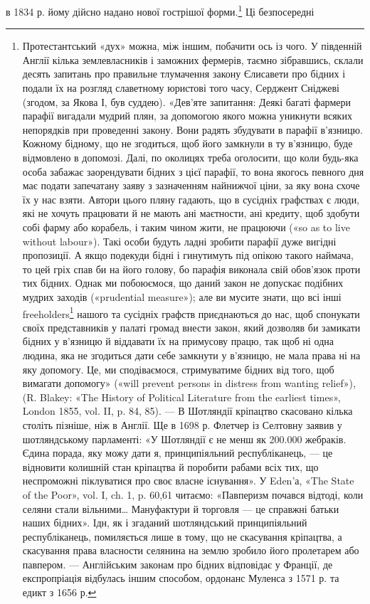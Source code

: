 \parcont{}  %
в 1834 р. йому дійсно надано нової гострішої форми.\footnote{
Протестантський «дух» можна, між іншим, побачити ось із чого.
У південній Англії кілька землевласників і заможних фермерів, таємно
зібравшись, склали десять запитань про правильне тлумачення закону
Єлисавети про бідних і подали їх на розгляд славетному юристові того
часу, Серджент Сніджеві (згодом, за Якова І, був суддею). «Дев’яте запитання:
Деякі багаті фармери парафії вигадали мудрий плян, за допомогою
якого можна уникнути всяких непорядків при проведенні закону.
Вони радять збудувати в парафії в’язницю. Кожному бідному, що не
згодиться, щоб його замкнули в ту в’язницю, буде відмовлено в допомозі.
Далі, по околицях треба оголосити, що коли будь-яка особа забажає
заорендувати бідних з цієї парафії, то вона якогось певного дня
має подати запечатану заяву з зазначенням найнижчої ціни, за яку вона
схоче їх у нас взяти. Автори цього пляну гадають, що в сусідніх графствах
є люди, які не хочуть працювати й не мають ані маєтности, ані
кредиту, щоб здобути собі фарму або корабель, і таким чином жити,
не працюючи («so as to live without labour»). Такі особи будуть ладні
зробити парафії дуже вигідні пропозиції. А якщо подекуди бідні і гинутимуть
під опікою такого наймача, то цей гріх спав би на його голову,
бо парафія виконала свій обов’язок проти тих бідних. Однак ми побоюємося,
що даний закон не допускає подібних мудрих заходів («prudential
measure»); але ви мусите знати, що всі інші freeholders\footnote*{
— вільні дрібні господарства. \emph{Ред.}
} нашого та
сусідніх графств приєднаються до нас, щоб спонукати своїх представників
у палаті громад внести закон, який дозволяв би замикати бідних у
в’язницю й віддавати їх на примусову працю, так щоб ні одна людина,
яка не згодиться дати себе замкнути у в’язницю, не мала права ні на яку
допомогу. Це, ми сподіваємося, стримуватиме бідних від того, щоб вимагати
допомогу» («will prevent persons in distress from wanting relief»),
(R. Blakey: «The History of Political Literature from the earliest times»,
London 1855, vol. II, p. 84, 85). — В Шотляндії кріпацтво скасовано
кілька століть пізніше, ніж в Англії. Ще в 1698 р. Флетчер із Селтовну
заявив у шотляндському парламенті: «У Шотляндії є не менш як 200.000
жебраків. Єдина порада, яку можу дати я, принципіяльний республіканець,
— це відновити колишній стан кріпацтва й поробити рабами всіх
тих, що неспроможні піклуватися про своє власне існування». У Eden’а,
«The State of the Poor», vol. I, ch. 1, p. 60,61 читаємо: «Павперизм почався
відтоді, коли селяни стали вільними\dots{} Мануфактури й торговля —
це справжні батьки наших бідних». Ідн, як і згаданий шотляндський
принципіяльний республіканець, помиляється лише в тому, що не скасування
кріпацтва, а скасування права власности селянина на землю
зробило його пролетарем або павпером. — Англійським законам про
бідних відповідає у Франції, де експропріація відбулась іншим способом,
ордонанс Муленса з 1571 р. та едикт з 1656 р.
} Ці безпосередні
